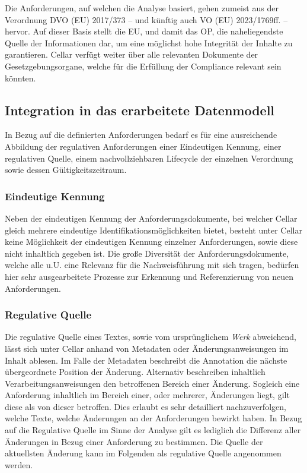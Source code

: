     \medskip
    Die Anforderungen, auf welchen die Analyse basiert, gehen zumeist aus der Verordnung \ac{DVO} (\ac{EU}) 2017/373 -- und künftig auch \ac{VO} (\ac{EU}) 2023/1769ff. -- hervor. 
    Auf dieser Basis stellt die \ac{EU}, und damit das \ac{OP}, die naheliegendste Quelle der Informationen dar, um eine möglichst hohe Integrität der Inhalte zu garantieren.
    Cellar verfügt weiter über alle relevanten Dokumente der Gesetzgebungsorgane, welche für die Erfüllung der Compliance relevant sein könnten. 

\pagebreak
\subsection{Integration in das erarbeitete Datenmodell}
    
    In Bezug auf die definierten Anforderungen bedarf es für eine ausreichende Abbildung der regulativen Anforderungen einer Eindeutigen Kennung, einer regulativen Quelle, einem nachvollziehbaren Lifecycle der einzelnen Verordnung sowie dessen Gültigkeitszeitraum.
    
\subsubsection{Eindeutige Kennung}
    
    Neben der eindeutigen Kennung der Anforderungsdokumente, bei welcher Cellar gleich mehrere eindeutige Identifikationsmöglichkeiten bietet, besteht unter Cellar keine Möglichkeit der eindeutigen Kennung einzelner Anforderungen, sowie diese nicht inhaltlich gegeben ist. 
    Die große Diversität der Anforderungsdokumente, welche alle u.U. eine Relevanz für die Nachweisführung mit sich tragen, bedürfen hier sehr ausgearbeitete Prozesse zur Erkennung und Referenzierung von neuen Anforderungen.  

\subsubsection{Regulative Quelle}
    
    Die regulative Quelle eines Textes, sowie vom ursprünglichem \textit{Werk} abweichend, lässt sich unter Cellar anhand von Metadaten oder Änderungsanweisungen im Inhalt ablesen.
    Im Falle der Metadaten beschreibt die Annotation die nächste übergeordnete Position der Änderung.
    Alternativ beschreiben inhaltlich Verarbeitungsanweisungen den betroffenen Bereich einer Änderung. 
    Sogleich eine Anforderung inhaltlich im Bereich einer, oder mehrerer, Änderungen liegt, gilt diese als von dieser betroffen.
    Dies erlaubt es sehr detailliert nachzuverfolgen, welche Texte, welche Änderungen an der Anforderungen bewirkt haben.
    In Bezug auf die Regulative Quelle im Sinne der Analyse gilt es lediglich die Differenz aller Änderungen in Bezug einer Anforderung zu bestimmen.
    Die Quelle der aktuellsten Änderung kann im Folgenden als regulative Quelle angenommen werden.

